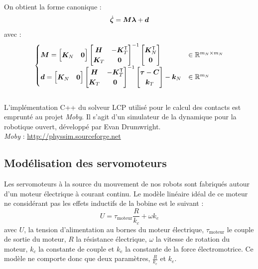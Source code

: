 On obtient la forme canonique :
$$
\dot{\bm{\zeta}} = \bm{M}\bm{\lambda} + \bm{d} \\
$$
avec :
$$
\begin{cases}
\bm{M} = 
\begin{bmatrix}
    \bm{K}_{N} & \bm{0} \\
\end{bmatrix}
\begin{bmatrix}
    \bm{H} & -\bm{K}^{\mathsf{T}}_{T} \\
    \bm{K}_{T} & \bm{0} \\
\end{bmatrix}^{-1}
\begin{bmatrix}
    \bm{K}^{\mathsf{T}}_{N} \\ \bm{0} \\
\end{bmatrix}
& \in \mathbb{R}^{m_{N} \times m_{N}} \\
\bm{d} = 
\begin{bmatrix}
    \bm{K}_{N} & \bm{0} \\
\end{bmatrix}
\begin{bmatrix}
    \bm{H} & -\bm{K}^{\mathsf{T}}_{T} \\
    \bm{K}_{T} & \bm{0} \\
\end{bmatrix}^{-1}
\begin{bmatrix}
    \bm{\tau} - \bm{C} \\
    \bm{k}_{T} \\
\end{bmatrix}
-
\bm{k}_{N}
& \in \mathbb{R}^{m_{N}} \\
\end{cases}
$$
\\

L'implémentation C++ du solveur LCP utilisé pour le calcul des 
contacts est emprunté au projet \textit{Moby}.
Il s'agit d'un simulateur de la dynamique pour la robotique ouvert, 
développé par Evan Drumwright.\\
\textit{Moby} : \url{http://physsim.sourceforge.net}\\

\subsection{Modélisation des servomoteurs\label{sec:model_servos}}

Les servomoteurs à la source du mouvement de nos robots
sont fabriqués autour d'un moteur électrique à courant continu.
Le modèle linéaire idéal de ce moteur ne considérant pas 
les effets inductifs de la bobine est le suivant : 
$$
U = \tau_{\text{moteur}} \frac{R}{k_{c}} + \omega k_{e}
$$
avec $U$, la tension d'alimentation au bornes du moteur électrique,
$\tau_{\text{moteur}}$ le couple de sortie du moteur, $R$ la résistance
électrique, $\omega$ la vitesse de rotation du moteur, $k_{c}$ la constante 
de couple et $k_{e}$ la constante de la force électromotrice.
Ce modèle ne comporte donc que deux paramètres, $\frac{R}{k_{c}}$ et $k_{e}$.\\


